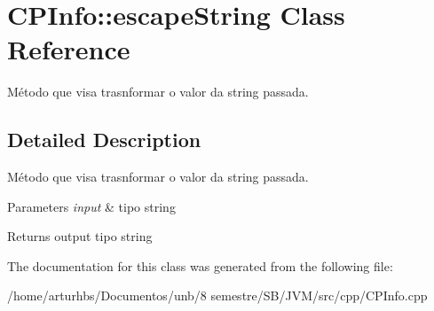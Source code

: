 \hypertarget{classCPInfo_1_1escapeString}{}\section{C\+P\+Info\+:\+:escape\+String Class Reference}
\label{classCPInfo_1_1escapeString}


Método que visa trasnformar o valor da string passada.  




\subsection{Detailed Description}
Método que visa trasnformar o valor da string passada. 


\begin{DoxyParams}{Parameters}
{\em input} & tipo string \\
\hline
\end{DoxyParams}
\begin{DoxyReturn}{Returns}
output tipo string 
\end{DoxyReturn}


The documentation for this class was generated from the following file\+:\begin{DoxyCompactItemize}
\item 
/home/arturhbs/\+Documentos/unb/8 semestre/\+S\+B/\+J\+V\+M/src/cpp/C\+P\+Info.\+cpp\end{DoxyCompactItemize}
